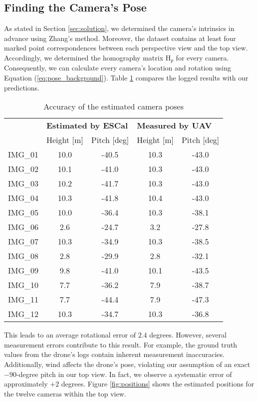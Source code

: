 \subsection{Finding the Camera's Pose}
As stated in Section \ref{sec:solution}, we determined the camera's 
intrinsics in advance using Zhang's \cite{zhang2000} method. Moreover, 
the dataset contains at least four marked point correspondences between each 
perspective view and the top view. Accordingly, we determined the 
homography matrix $\mathrm{H}_p$ for every camera. Consequently, we can 
calculate every camera's location and rotation using Equation 
(\ref{eq:pose_background}).
Table \ref{tab:camera_pose} compares the logged results with our predictions.

\begin{table}[hb]
	\caption{Accuracy of the estimated camera poses}
		\begin{tabular*}{\columnwidth}{@{\extracolsep{\fill}} l cccc}
			\toprule
			&
			\multicolumn{2}{l}{\textbf{Estimated by ESCal}} & 
			\multicolumn{2}{l}{\textbf{Measured by UAV}} \\
			& Height [m] & Pitch [deg] & Height [m] & Pitch [deg] \\
			\midrule
			IMG\_01 & 10.0 & -40.5 & 10.3 & -43.0 \\
			IMG\_02 & 10.1 & -41.0 & 10.3 & -43.0 \\
			IMG\_03 & 10.2 & -41.7 & 10.3 & -43.0 \\
			IMG\_04 & 10.3 & -41.8 & 10.4 & -43.0 \\
			IMG\_05 & 10.0 & -36.4 & 10.3 & -38.1 \\
			IMG\_06 & 2.6  & -24.7 & 3.2  & -27.8 \\
			IMG\_07 & 10.3 & -34.9 & 10.3 & -38.5 \\
			IMG\_08 & 2.8  & -29.9 & 2.8  & -32.1 \\
			IMG\_09 & 9.8  & -41.0 & 10.1 & -43.5 \\
			IMG\_10 & 7.7  & -36.2 & 7.9  & -38.7 \\
			IMG\_11 & 7.7  & -44.4 & 7.9  & -47.3 \\
			IMG\_12 & 10.3 & -34.7 & 10.3 & -36.8 \\
			\bottomrule
		\end{tabular*}
	\label{tab:camera_pose}
\end{table}

This leads to an average rotational error of $2.4$ degrees. However, 
several measurement errors contribute to this result. For example, the ground 
truth values from the drone's logs contain inherent measurement inaccuracies. 
Additionally, wind affects the drone's pose, violating our assumption of an 
exact $-90$-degree pitch in our top view. In fact, we observe a 
systematic error of approximately $+2$ degrees. 
Figure \ref{fig:positions} shows 
the estimated positions for the twelve cameras within the top view.

